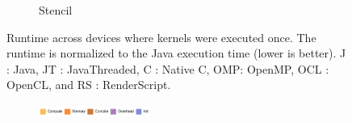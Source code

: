 \begin{figure}
\begin{subfigure}[b]{0.33\textwidth}
      \caption{Stencil}
  \end{subfigure}
  \caption{Runtime across devices where kernels were executed once. The runtime is normalized to the Java execution time (lower is better). J : Java, JT : JavaThreaded, C : Native C, OMP: OpenMP, OCL : OpenCL, and RS : RenderScript.}
  \label{fig:perfOne}
\end{figure}

\begin{figure}

  \centering
  \begin{subfigure}[b]{\textwidth}
          \centering
          \includegraphics[width=0.4\textwidth]{data/legend.pdf}
  \end{subfigure}


\end{figure}
